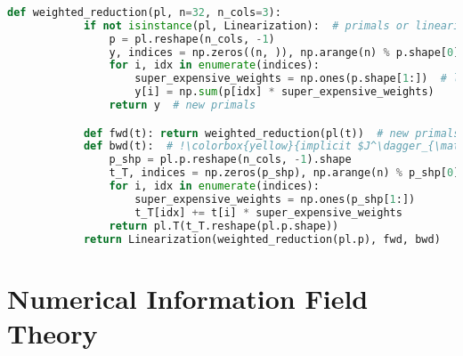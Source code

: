 \documentclass[aspectratio=169,xcolor=dvipsnames]{beamer}
\begin{document}
\begin{frame}[fragile]
	\frametitle{\insertsection}
	\framesubtitle{\insertsubsection}

	\vspace{-1em}
	\begin{lstlisting}[language=python,escapechar=!,basicstyle=\fontsize{8}{9}\selectfont\ttfamily]
		def weighted_reduction(pl, n=32, n_cols=3):
			if not isinstance(pl, Linearization):  # primals or linearization
				p = pl.reshape(n_cols, -1)
				y, indices = np.zeros((n, )), np.arange(n) % p.shape[0]
				for i, idx in enumerate(indices):
					super_expensive_weights = np.ones(p.shape[1:])  # large weights
					y[i] = np.sum(p[idx] * super_expensive_weights)
				return y  # new primals

			def fwd(t): return weighted_reduction(pl(t))  # new primals
			def bwd(t):  # !\colorbox{yellow}{implicit $J^\dagger_{\mathrm{wr},\mathrm{pl.p}}$ which re-computes all weights}!
				p_shp = pl.p.reshape(n_cols, -1).shape
				t_T, indices = np.zeros(p_shp), np.arange(n) % p_shp[0]
				for i, idx in enumerate(indices):
					super_expensive_weights = np.ones(p_shp[1:])
					t_T[idx] += t[i] * super_expensive_weights
				return pl.T(t_T.reshape(pl.p.shape))
			return Linearization(weighted_reduction(pl.p), fwd, bwd)
	\end{lstlisting}
\end{frame}

\section{Numerical Information Field Theory}  %


\end{document}
